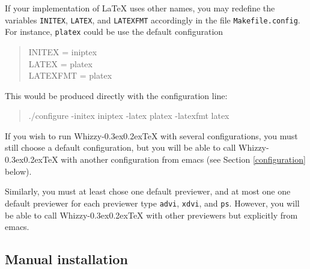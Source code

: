 \documentclass[12pt]{article}
\makeatletter
\let \lst \verb
\def \whizzy {{Whizzy\kern -0.3ex\raise 0.2ex\hbox{\let \@\relax\TeX}}}
\makeatother
\begin{document}
If your implementation of {\LaTeX}
uses other names, you may redefine the variables \lst"INITEX",
\lst"LATEX", and \lst"LATEXFMT" accordingly in the file
\lst"Makefile.config".
%
For instance, \lst"platex" could be use the default configuration
\begin{quote}
\begin{tt}
INITEX = iniptex\\
LATEX = platex\\
LATEXFMT = platex
\end{tt}
\end{quote}
This would be produced directly with the configuration line:
\begin{quote}
\begin{tt}
./configure -initex iniptex -latex platex -latexfmt latex
\end{tt}
\end{quote}
If you wish to run {\whizzy} with several configurations, you must still
choose a default configuration, but you will be able to call {\whizzy} with
another configuration from emacs (see Section \ref{configuration} below).

Similarly, you must at least chose one default previewer, and at most one 
one default previewer for each previewer type \lst"advi", \lst"xdvi", and
\lst"ps". However, you will be able to call {\whizzy} with 
other previewers but explicitly from emacs.

\subsection {Manual installation}
\end{document}
